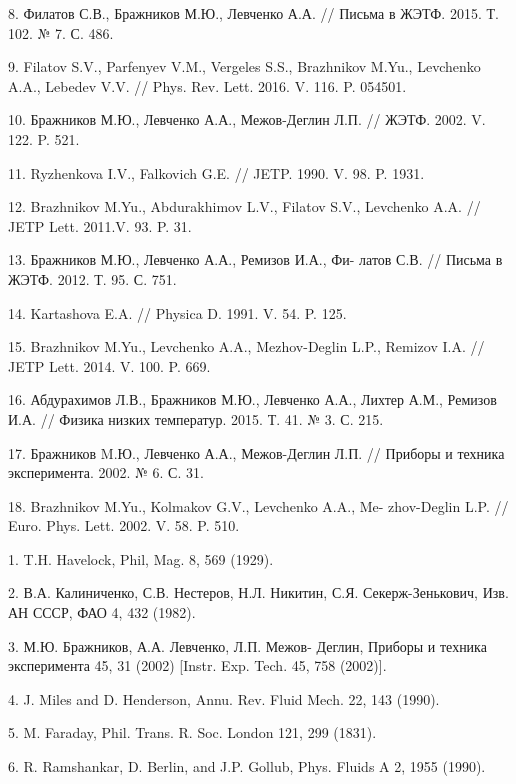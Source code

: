 \begin{thebibliography}{99}
8. Филатов С.В., Бражников М.Ю., Левченко А.А. // Письма в ЖЭТФ. 2015. Т. 102. № 7. С. 486.

9. Filatov S.V., Parfenyev V.M., Vergeles S.S., Brazhnikov M.Yu., Levchenko A.A., Lebedev V.V. // Phys. Rev. Lett. 2016. V. 116. P. 054501.

10. Бражников М.Ю., Левченко А.А., Межов-Деглин Л.П. // ЖЭТФ. 2002. V. 122. P. 521.

11. Ryzhenkova I.V., Falkovich G.E. // JETP. 1990. V. 98. P. 1931.

12. Brazhnikov M.Yu., Abdurakhimov L.V., Filatov S.V., Levchenko A.A. // JETP Lett. 2011.V. 93. P. 31.

13. Бражников М.Ю., Левченко А.А., Ремизов И.А., Фи- латов С.В. // Письма в ЖЭТФ. 2012. Т. 95. С. 751.

14. Kartashova E.A. // Physica D. 1991. V. 54. P. 125.

15. Brazhnikov M.Yu., Levchenko A.A., Mezhov-Deglin L.P., Remizov I.A. // JETP Lett. 2014. V. 100. P. 669.

16. Абдурахимов Л.В., Бражников М.Ю., Левченко А.А., Лихтер А.М., Ремизов И.А. // Физика низких температур. 2015. Т. 41. № 3. С. 215.

17. Бражников M.Ю., Левченко А.А., Межов-Деглин Л.П. // Приборы и техника эксперимента. 2002. № 6. С. 31.

18. Brazhnikov M.Yu., Kolmakov G.V., Levchenko A.A., Me- zhov-Deglin L.P. // Euro. Phys. Lett. 2002. V. 58. P. 510.


1. T.H. Havelock, Phil, Mag. 8, 569 (1929).

2. В.А. Калиниченко, С.В. Нестеров, Н.Л. Никитин, С.Я. Секерж-Зенькович, Изв. АН СССР, ФАО 4, 432 (1982).

3. М.Ю. Бражников, А.А. Левченко, Л.П. Межов- Деглин, Приборы и техника эксперимента 45, 31 (2002) [Instr. Exp. Tech. 45, 758 (2002)].

4. J. Miles and D. Henderson, Annu. Rev. Fluid Mech. 22, 143 (1990).

5. M. Faraday, Phil. Trans. R. Soc. London 121, 299 (1831).

6. R. Ramshankar, D. Berlin, and J.P. Gollub, Phys. Fluids A 2, 1955 (1990).


\end{thebibliography}
